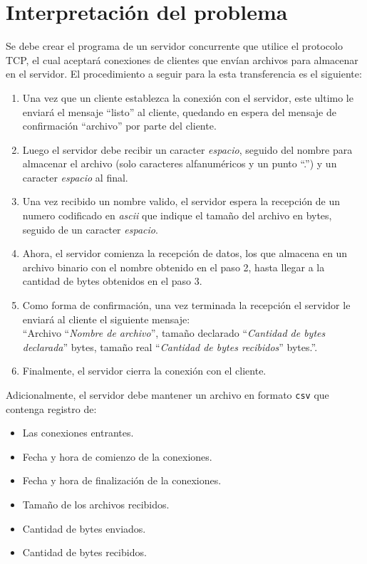 \section{Interpretación del problema}

Se debe crear el programa de un servidor concurrente que utilice el protocolo TCP, el cual aceptará conexiones de clientes que envían archivos para almacenar en el servidor. El procedimiento a seguir para la esta transferencia es el siguiente:

\begin{enumerate}\bfseries
    \item \textnormal{Una vez que un cliente establezca la conexión con el servidor, este ultimo le enviará el mensaje ``listo'' al cliente, quedando en espera del mensaje de confirmación ``archivo'' por parte del cliente.}
    \item \textnormal{Luego el servidor debe recibir un caracter \textit{espacio}, seguido del nombre para almacenar el archivo (solo caracteres alfanuméricos y un punto ``.'') y un caracter \textit{espacio} al final.}
    \item \textnormal{Una vez recibido un nombre valido, el servidor espera la recepción de un numero codificado en \textit{ascii} que indique el tamaño del archivo en bytes, seguido de un caracter \textit{espacio}.}
    \item \textnormal{Ahora, el servidor comienza la recepción de datos, los que almacena en un archivo binario con el nombre obtenido en el paso 2, hasta llegar a la cantidad de bytes obtenidos en el paso 3.}
    \item \textnormal{Como forma de confirmación, una vez terminada la recepción el servidor le enviará al cliente el siguiente mensaje:\\
     ``Archivo \enquote{\textit{Nombre de archivo}}, tamaño declarado \enquote{\textit{Cantidad de bytes declarada}} bytes, tamaño real \enquote{\textit{Cantidad de bytes recibidos}} bytes.''.}
    \item \textnormal{Finalmente, el servidor cierra la conexión con el cliente.}\\ 
\end{enumerate}

Adicionalmente, el servidor debe mantener un archivo en formato \texttt{csv} que contenga registro de:

\begin{itemize}
    \item Las conexiones entrantes.
    \item Fecha y hora de comienzo de la conexiones.
    \item Fecha y hora de finalización de la conexiones.
    \item Tamaño de los archivos recibidos.
    \item Cantidad de bytes enviados.
    \item Cantidad de bytes recibidos.\\
\end{itemize}

